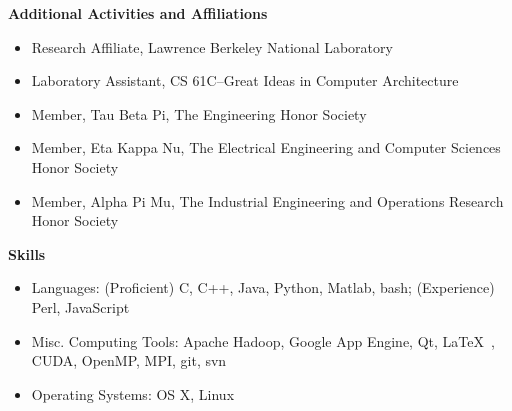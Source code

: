 \documentclass[letterpaper,11pt]{article}
\newcommand{\desitem}[1]{\item #1 \vspace{-7pt}}
\newcommand{\resheading}[1]{{\large \colorbox{mygrey}{\begin{minipage}{\textwidth}{\textbf{#1 \vphantom{p\^{E}}}}\end{minipage}}}}
\begin{document}
\resheading{Additional Activities and Affiliations}
\begin{itemize}
    \desitem{Research Affiliate,
    Lawrence Berkeley National Laboratory}
   \desitem{Laboratory Assistant,
    CS 61C--Great Ideas in Computer Architecture}    
    \desitem{Member,
    Tau Beta Pi, The Engineering Honor Society}
     \desitem{Member,
    Eta Kappa Nu, The Electrical Engineering and Computer Sciences Honor Society}
    \desitem{Member,
    Alpha Pi Mu, The Industrial Engineering and Operations Research Honor Society}
\end{itemize}

\vspace{0.1in}

\resheading{Skills}
\begin{itemize}
    \desitem{Languages:
                    (Proficient) C, C++, Java, Python, Matlab, bash; (Experience) Perl, JavaScript}
    \desitem{Misc. Computing Tools:
                     Apache Hadoop, Google App Engine, Qt, \LaTeX\ , CUDA, OpenMP, MPI, git, svn}
    \desitem{Operating Systems:
                     OS X, Linux}
\end{itemize}
\end{document}
